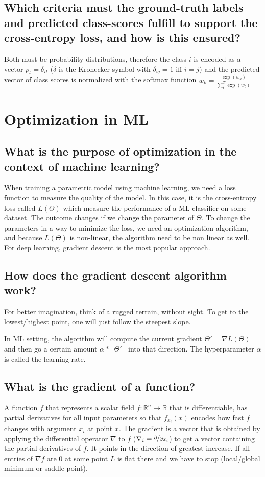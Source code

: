 \subsection{Which criteria must the ground-truth labels and predicted class-scores fulfill to support the cross-entropy loss, and how is this ensured?}
Both must be probability distributions, therefore the class $i$ is encoded as a vector $p_t = \delta_{it}$ ($\delta$ is the Kronecker symbol with $\delta_{ij} = 1$ iff $i = j$) and the predicted vector of class scores is normalized with the softmax function $w_k =  \frac{\exp(w_k)}{\sum_t^T \exp(w_t)}$

\section{Optimization in ML}
\subsection{What is the purpose of optimization in the context of machine learning?}

When training a parametric model using machine learning, we need a loss function to measure the quality of the model. In this case, it is the cross-entropy loss called $L(\Theta)$ which measure the performance of a ML classifier on some dataset. The outcome changes if we change the parameter of $\Theta$. To change the parameters in a way to minimize the loss, we need an optimization algorithm, and because $L(\Theta)$ is non-linear, the algorithm need to be non linear as well. For deep learning, gradient descent is the most popular approach.

\subsection{How does the gradient descent algorithm work?}
For better imagination, think of a rugged terrain, without sight. To get to the lowest/highest point, one will just follow the steepest slope. 

In  ML setting, the algorithm will compute the current gradient $\Theta' = \nabla L(\Theta)$ and then go a certain amount $\alpha*||\Theta'||$ into that direction. The hyperparameter $\alpha$ is called the learning rate.
\subsection{What is the gradient of a function? }
A function $f$ that represents a scalar field $f: \mathbb R^n \to \mathbb R$ that is differentiable, has partial derivatives for all input parameters so that $f_{x_i}(x)$ encodes how fast $f$ changes with argument $x_i$ at point $x$.  The gradient is a vector that is obtained by applying the differential operator $\nabla$ to $f$ ($\nabla_i = \nicefrac{\partial}{\partial x_i}$) to get a vector containing the partial derivatives of $f$. It points in the direction of greatest increase. If all entries of $\nabla f$ are $0$ at some point $L$ is flat there and we have to stop (local/global minimum or saddle point).

